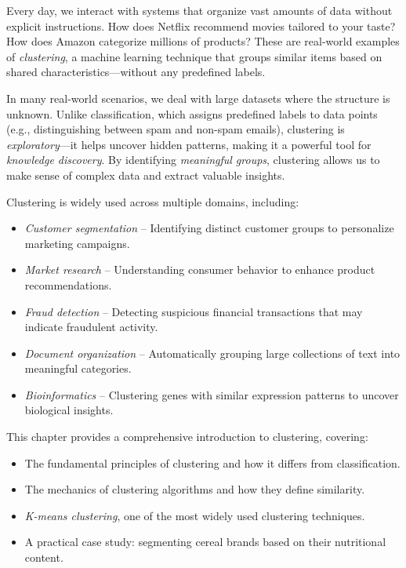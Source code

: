 \documentclass[
]{book}
\providecommand{\tightlist}{%
  \setlength{\itemsep}{0pt}\setlength{\parskip}{0pt}}
\theoremstyle{definition}
\theoremstyle{definition}
\theoremstyle{definition}
\theoremstyle{definition}
\theoremstyle{remark}
\begin{document}
Every day, we interact with systems that organize vast amounts of data without explicit instructions. How does Netflix recommend movies tailored to your taste? How does Amazon categorize millions of products? These are real-world examples of \emph{clustering}, a machine learning technique that groups similar items based on shared characteristics---without any predefined labels.

In many real-world scenarios, we deal with large datasets where the structure is unknown. Unlike classification, which assigns predefined labels to data points (e.g., distinguishing between spam and non-spam emails), clustering is \emph{exploratory}---it helps uncover hidden patterns, making it a powerful tool for \emph{knowledge discovery}. By identifying \emph{meaningful groups}, clustering allows us to make sense of complex data and extract valuable insights.

Clustering is widely used across multiple domains, including:

\begin{itemize}
\tightlist
\item
  \emph{Customer segmentation} -- Identifying distinct customer groups to personalize marketing campaigns.\\
\item
  \emph{Market research} -- Understanding consumer behavior to enhance product recommendations.\\
\item
  \emph{Fraud detection} -- Detecting suspicious financial transactions that may indicate fraudulent activity.\\
\item
  \emph{Document organization} -- Automatically grouping large collections of text into meaningful categories.\\
\item
  \emph{Bioinformatics} -- Clustering genes with similar expression patterns to uncover biological insights.
\end{itemize}

This chapter provides a comprehensive introduction to clustering, covering:

\begin{itemize}
\tightlist
\item
  The fundamental principles of clustering and how it differs from classification.\\
\item
  The mechanics of clustering algorithms and how they define similarity.\\
\item
  \emph{K-means clustering}, one of the most widely used clustering techniques.\\
\item
  A practical case study: segmenting cereal brands based on their nutritional content.
\end{itemize}
\end{document}
